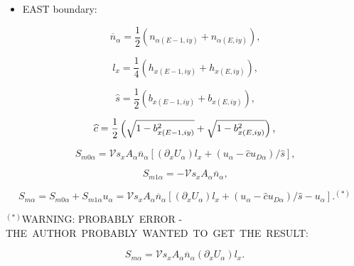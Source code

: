\documentclass[11pt]{article}
\begin{document}
\bigskip

\begin{itemize}
\item  EAST boundary:
\end{itemize}

\begin{equation}
\overline{n}_{\alpha}=\frac{1}{2}\left( n_{\alpha\left( E-1,iy\right)
}+n_{\alpha\left( E,iy\right) }\right) \text{,}   \label{c100}
\end{equation}

\begin{equation}
l_{x}=\frac{1}{4}\left( h_{x\left( E-1,iy\right) }+h_{x\left( E,iy\right)
}\right) \text{,}   \label{c101}
\end{equation}

\begin{equation}
\widehat{s}=\frac{1}{2}\left( b_{x\left( E-1,iy\right) }+b_{x\left(
E,iy\right) }\right) \text{,}   \label{c102}
\end{equation}

\begin{equation}
\widehat{c}=\frac{1}{2}\left( \sqrt{1-b_{x\left( E-1,iy\right) }^{2}}+\sqrt{%
1-b_{x\left( E,iy\right) }^{2}}\right) \text{,}   \label{c103}
\end{equation}

\begin{equation}
S_{m0\alpha}=\mathcal{V}s_{x}A_{\alpha}\overline{n}_{\alpha}\left[ \left(
\partial_{x}U_{\alpha}\right) l_{x}+\left( u_{\alpha}-\widehat{c}u_{D\alpha
}\right) /\widehat{s}\right] \text{,}   \label{c104}
\end{equation}

\begin{equation}
S_{m1\alpha}=-\mathcal{V}s_{x}A_{\alpha}\overline{n}_{\alpha}\text{,} 
\label{c105}
\end{equation}

\begin{equation}
S_{m\alpha}=S_{m0\alpha}+S_{m1\alpha}u_{\alpha}=\mathcal{V}s_{x}A_{\alpha }%
\overline{n}_{\alpha}\left[ \left( \partial_{x}U_{\alpha}\right)
l_{x}+\left( u_{\alpha}-\widehat{c}u_{D\alpha}\right) /\widehat{s}-u_{\alpha}%
\right] \text{.}^{\left( \ast\right) }   \label{c106}
\end{equation}

\bigskip

$^{\left( \ast\right) }$WARNING: PROBABLY\ ERROR - THE\ AUTHOR\ PROBABLY\
WANTED\ TO\ GET\ THE\ RESULT:

\begin{equation*}
S_{m\alpha}=\mathcal{V}s_{x}A_{\alpha}\overline{n}_{\alpha}\left(
\partial_{x}U_{\alpha}\right) l_{x}\text{.}
\end{equation*}
\end{document}
